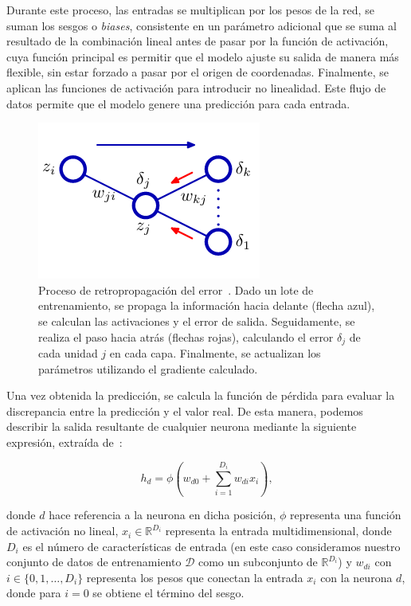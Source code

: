 Durante este proceso, las entradas se multiplican por los pesos de la red, se suman los sesgos o \emph{biases}, consistente en un parámetro adicional que se suma al resultado de la combinación lineal antes de pasar por la función de activación, cuya función principal es permitir que el modelo ajuste su salida de manera más flexible, sin estar forzado a pasar por el origen de coordenadas. Finalmente, se aplican las funciones de activación para introducir no linealidad. Este flujo de datos permite que el modelo genere una predicción para cada entrada.

\begin{figure}[h]
    \centering
    \includegraphics[width=0.3\linewidth]{img/aprendizajegd.png}
    \caption[Proceso de retropropagación del error~\cite{Bishop2006}.]{Proceso de retropropagación del error~\cite{Bishop2006}. Dado un lote de entrenamiento, se propaga la información hacia delante (flecha azul), se calculan las activaciones y el error de salida. Seguidamente, se realiza el paso hacia atrás (flechas rojas), calculando el error $\delta_j$ de cada unidad $j$ en cada capa. Finalmente, se actualizan los parámetros utilizando el gradiente calculado.}\label{fig:aprendizajegd}
\end{figure}

Una vez obtenida la predicción, se calcula la función de pérdida para evaluar la discrepancia entre la predicción y el valor real. De esta manera, podemos describir la salida resultante de cualquier neurona mediante la siguiente expresión, extraída de~\cite{Prince2023}:

\begin{equation}
    h_d = \phi \left( w_{d0} + \sum_{i=1}^{D_i} w_{di} x_i \right),
    \label{eq:hidden_unit}
\end{equation}

donde $d$ hace referencia a la neurona en dicha posición, $\phi$ representa una función de activación no lineal, $x_i \in \mathbb{R}^{D_i}$ representa la entrada multidimensional, donde $D_i$ es el número de características de entrada (en este caso consideramos nuestro conjunto de datos de entrenamiento $\mathcal{D}$ como un subconjunto de $\mathbb{R}^{D_i}$) y $w_{di}$ con $i \in \{0,1,\ldots,D_i\}$ representa los pesos que conectan la entrada $x_i$ con la neurona $d$, donde para $i = 0$ se obtiene el término del sesgo.

